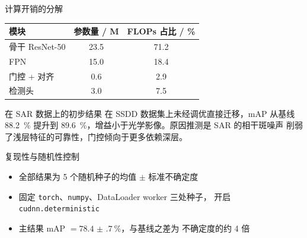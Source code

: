 \begin{frame}[label=bk:cost]{计算开销的分解}
  \begin{table}
    \centering\small
    \begin{tabular}{l S[table-format=2.1] S[table-format=2.1]}
      \toprule
      {模块} & {参数量 / M} & {FLOPs 占比 / \%} \\
      \midrule
      骨干 ResNet-50 & 23.5 & 71.2 \\
      FPN            & 15.0 & 18.4 \\
      门控 + 对齐    & 0.6  & 2.9  \\
      检测头         & 3.0  & 7.5  \\
      \bottomrule
    \end{tabular}
  \end{table}
\end{frame}

\begin{frame}[label=bk:sar]{在 SAR 数据上的初步结果}
  在 SSDD 数据集上未经调优直接迁移，mAP 从基线 \qty{88.2}{\percent} 提升到
  \qty{89.6}{\percent}，增益小于光学影像。原因推测是 SAR 的相干斑噪声
  削弱了浅层特征的可靠性，门控倾向于更多依赖深层。

\end{frame}

\begin{frame}[label=bk:repro]{复现性与随机性控制}
  \begin{itemize}
    \setlength{\itemsep}{0.6em}
    \item 全部结果为 5 个随机种子的均值 $\pm$ 标准不确定度
    \item 固定 \texttt{torch}、\texttt{numpy}、DataLoader worker 三处种子，
          开启 \texttt{cudnn.deterministic}
    \item 主结果 mAP $= \qty{78.4(7)}{\percent}$，与基线之差为
          不确定度的约 4 倍
  \end{itemize}
\end{frame}
